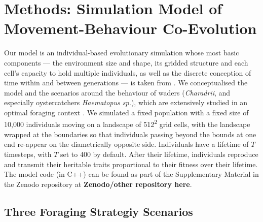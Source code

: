 \documentclass[11pt]{article}
\begin{document}
\section{Methods: Simulation Model of Movement-Behaviour Co-Evolution}

Our model is an individual-based evolutionary simulation whose most basic components --- the environment size and shape, its gridded structure and each cell's capacity to hold multiple individuals, as well as the discrete conception of time within and between generations --- is taken from \citet{netz2020}.
We conceptualised the model and the scenarios around the behaviour of waders (\textit{Charadrii}, and especially oystercatchers \textit{Haematopus sp.}), which are extensively studied in an optimal foraging context \citep[e.g. ][]{vahl2005, vahl2005a, vahl2005b, ENS1990219}.
We simulated a fixed population with a fixed size of 10,000 individuals moving on a landscape of 512\textsuperscript{2} grid cells, with the landscape wrapped at the boundaries so that individuals passing beyond the bounds at one end re-appear on the diametrically opposite side.
Individuals have a lifetime of $T$ timesteps, with $T$ set to 400 by default.
After their lifetime, individuals reproduce and transmit their heritable traits proportional to their fitness over their lifetime.
The model code (in C++) can be found as part of the Supplementary Material in the Zenodo repository at \textbf{Zenodo/other repository here}.

\subsection{Three Foraging Strategiy Scenarios}
\end{document}
